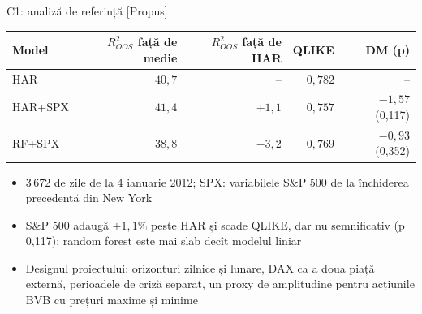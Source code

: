 \ifsolutions
\begin{frame}{C1: analiză de referință [Propus]}
\itemsize{\footnotesize}
\begin{center}
\footnotesize
\begin{tabular}{lrrrr}
\toprule
Model & $R^2_{OOS}$ față de medie & $R^2_{OOS}$ față de HAR & QLIKE & DM (p) \\
\midrule
HAR & $40{,}7$ & -- & $0{,}782$ & -- \\
HAR+SPX & $41{,}4$ & ${+1{,}1}$ & $0{,}757$ & ${-1{,}57}$ (0{,}117) \\
RF+SPX & $38{,}8$ & ${-3{,}2}$ & $0{,}769$ & ${-0{,}93}$ (0{,}352) \\
\bottomrule
\end{tabular}
\end{center}
\begin{itemize}
    \item 3\,672 de zile de la 4 ianuarie 2012; SPX: variabilele S\&P 500 de la închiderea precedentă din New York
    \item S\&P 500 adaugă $+1{,}1\%$ peste HAR și scade QLIKE, dar nu semnificativ (p 0{,}117); random forest este mai slab decît modelul liniar
    \item Designul proiectului: orizonturi zilnice și lunare, DAX ca a doua piață externă, perioadele de criză separat, un proxy de amplitudine pentru acțiunile BVB cu prețuri maxime și minime
\end{itemize}
\end{frame}
\fi

